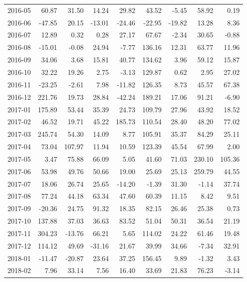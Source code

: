 \begin{table}[ht]
\begin{tabular}{lrrrrrrrr}
  2016-05 & 60.87 & 31.50 & 14.24 & 29.82 & 43.52 & -5.45 & 58.92 & 0.19 \\ 
  2016-06 & -47.85 & 20.15 & -13.01 & -24.46 & -22.95 & -19.82 & 13.28 & 8.36 \\ 
  2016-07 & 12.89 & 0.32 & 0.28 & 27.17 & 67.67 & -2.34 & 30.65 & -0.88 \\ 
  2016-08 & -15.01 & -0.08 & 24.94 & -7.77 & 136.16 & 12.31 & 63.77 & 11.96 \\ 
  2016-09 & 34.06 & 3.68 & 15.81 & 40.77 & 134.62 & 3.96 & 59.12 & 15.87 \\ 
  2016-10 & 32.22 & 19.26 & 2.75 & -3.13 & 129.87 & 0.62 & 2.95 & 27.02 \\ 
  2016-11 & -23.25 & -2.61 & 7.98 & -11.82 & 126.35 & 8.73 & 45.57 & 67.38 \\ 
  2016-12 & 221.76 & 19.73 & 28.84 & -42.24 & 189.21 & 17.06 & 91.21 & -6.90 \\ 
  2017-01 & 175.89 & 53.44 & 35.39 & 24.73 & 109.79 & 27.96 & 43.92 & 18.52 \\ 
  2017-02 & 46.52 & 19.71 & 45.22 & 185.73 & 110.54 & 28.40 & 48.20 & 77.02 \\ 
  2017-03 & 245.74 & 54.30 & 14.09 & 8.77 & 105.91 & 35.37 & 84.29 & 25.11 \\ 
  2017-04 & 73.04 & 107.97 & 11.94 & 10.59 & 123.39 & 45.54 & 67.99 & 2.00 \\ 
  2017-05 & 3.47 & 75.88 & 66.09 & 5.05 & 41.60 & 71.03 & 230.10 & 105.36 \\ 
  2017-06 & 53.98 & 49.76 & 50.66 & 19.00 & 25.69 & 25.13 & 259.79 & 44.55 \\ 
  2017-07 & 18.06 & 26.74 & 25.65 & -14.20 & -1.39 & 31.30 & -1.14 & 37.74 \\ 
  2017-08 & 77.24 & 44.18 & 63.34 & 47.60 & 60.39 & 11.15 & 8.42 & 9.51 \\ 
  2017-09 & -20.36 & 24.75 & 91.32 & 18.35 & 82.15 & 26.46 & 25.38 & 0.73 \\ 
  2017-10 & 137.88 & 37.03 & 36.63 & 83.52 & 51.04 & 50.31 & 36.54 & 21.19 \\ 
  2017-11 & 304.23 & -13.76 & 66.21 & 5.65 & 114.02 & 24.22 & 61.46 & 19.48 \\ 
  2017-12 & 114.12 & 49.69 & -31.16 & 21.67 & 39.99 & 34.66 & -7.34 & 32.91 \\ 
  2018-01 & -11.47 & -20.87 & 23.64 & 37.25 & 156.45 & 9.89 & -1.32 & 3.43 \\ 
  2018-02 & 7.96 & 33.14 & 7.56 & 16.40 & 33.69 & 21.83 & 76.23 & -3.14 \\ 

\end{tabular}
\end{table}
